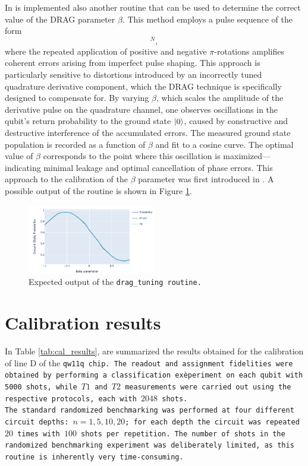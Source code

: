 In \Qibocal is implemented also another routine that can be used to determine the correct value of the DRAG parameter $\beta$. This method employs a pulse sequence of the form
\begin{equation}
    [X_{\pi} - X_{-\pi}]^N,
\end{equation}
where the repeated application of positive and negative $\pi$-rotations amplifies coherent errors arising from imperfect pulse shaping. 
This approach is particularly sensitive to distortions introduced by an incorrectly tuned quadrature derivative component, which the DRAG technique is specifically designed to compensate for. 
By varying $\beta$, which scales the amplitude of the derivative pulse on the quadrature channel, one observes oscillations in the qubit's return probability to the ground state $\ket{0}$, caused by constructive and destructive interference of the accumulated errors.
The measured ground state population is recorded as a function of $\beta$ and fit to a cosine curve. 
The optimal value of $\beta$ corresponds to the point where this oscillation is maximized—indicating minimal leakage and optimal cancellation of phase errors. 
This approach to the calibration of the $\beta$ parameter was first introduced in \cite{DRAG2}. 
A possible output of the routine is shown in Figure \ref{fig:drag_tuning}.

\begin{figure}[h!]
    \centering
    \includegraphics[width=0.5\textwidth]{figures/png/drag_tuning.png}
    \caption{Expected output of the \tt{drag\_tuning} routine.}
    \label{fig:drag_tuning}
\end{figure}

\section{Calibration results}

In Table \ref{tab:cal_results}, are summarized the results obtained for the calibration of line D of the \tt{qw11q} chip. 
The readout and assignment fidelities were obtained by performing a classification exèperiment on each qubit with 5000 shots, while $T1$ and $T2$ measurements were carried out using the respective protocols, each with $2048$ shots.\\
The standard randomized benchmarking was performed at four different circuit depths: $n=1,5,10,20$; for each depth the circuit was repeated $20$ times with $100$ shots per repetition. 
The number of shots in the randomized benchmarking experiment was deliberately limited, as this routine is inherently very time-consuming.

